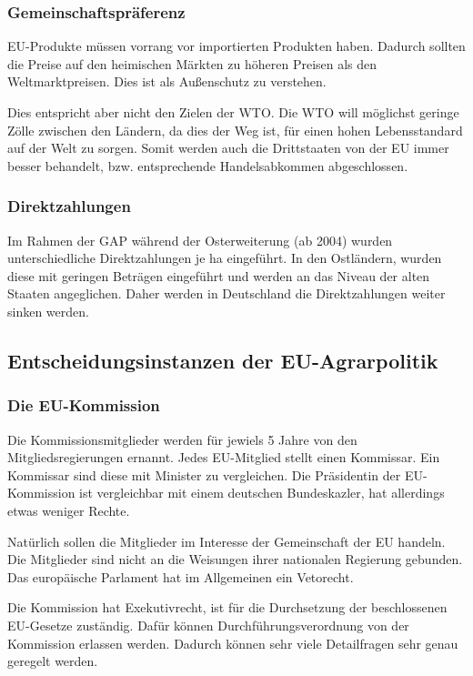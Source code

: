 \documentclass[11pt]{scrartcl}
\begin{document}
\subsubsection{Gemeinschaftspräferenz}
\ac{EU}-Produkte müssen vorrang vor importierten Produkten haben.
Dadurch sollten die Preise auf den heimischen Märkten zu höheren Preisen als den Weltmarktpreisen.
Dies ist als Außenschutz zu verstehen.

Dies entspricht aber nicht den Zielen der \ac{WTO}.
Die \ac{WTO} will möglichst geringe Zölle zwischen den Ländern, da dies der Weg ist, für einen hohen Lebensstandard auf der Welt zu sorgen.
Somit werden auch die Drittstaaten von der \ac{EU} immer besser behandelt, bzw. entsprechende Handelsabkommen abgeschlossen.

\subsubsection{Direktzahlungen}
Im Rahmen der \ac{GAP} während der Osterweiterung (ab 2004) wurden unterschiedliche Direktzahlungen je ha eingeführt.
In den Ostländern, wurden diese mit geringen Beträgen eingeführt und werden an das Niveau der alten Staaten angeglichen.
Daher werden in Deutschland die Direktzahlungen weiter sinken werden.

\subsection{Entscheidungsinstanzen der \ac{EU}-Agrarpolitik}

\subsubsection{Die \ac{EU}-Kommission}
Die Kommissionsmitglieder werden für jewiels 5 Jahre von den Mitgliedsregierungen ernannt.
Jedes \ac{EU}-Mitglied stellt einen Kommissar. Ein Kommissar sind diese mit Minister zu vergleichen.
Die Präsidentin der \ac{EU}-Kommission ist vergleichbar mit einem deutschen Bundeskazler, hat allerdings etwas weniger Rechte.

Natürlich sollen die Mitglieder im Interesse der Gemeinschaft der \ac{EU} handeln.
Die Mitglieder sind nicht an die Weisungen ihrer nationalen Regierung gebunden.
Das europäische Parlament hat im Allgemeinen ein Vetorecht.

Die Kommission hat Exekutivrecht, ist für die Durchsetzung der beschlossenen \ac{EU}-Gesetze zuständig.
Dafür können Durchführungsverordnung von der Kommission erlassen werden.
Dadurch können sehr viele Detailfragen sehr genau geregelt werden.
\end{document}
